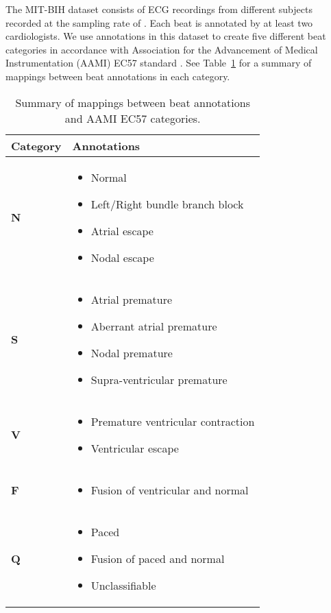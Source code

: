 \documentclass[10pt, conference, compsocconf]{IEEEtran}
\begin{document}
The MIT-BIH dataset consists of ECG recordings from  different subjects recorded at the sampling rate of . Each beat is annotated by at least two cardiologists. We use annotations in this dataset to create five different beat categories in accordance with Association for the Advancement of Medical Instrumentation (AAMI) EC57 standard \cite{association1998testing}. See Table~\ref{tab:aami} for a summary of mappings between beat annotations in each category.

\begin{table}[!t]
\renewcommand{\arraystretch}{1.3}
\caption{Summary of mappings between beat annotations and AAMI EC57 \cite{association1998testing} categories.}
\label{tab:aami}
\centering
\begin{tabular}{lp{2.0in}}
\hline
\textbf{Category} & \textbf{Annotations} \\
\hline
\hline
\textbf{N} & \begin{itemize} \item Normal \item Left/Right bundle branch block \item Atrial escape \item Nodal escape \end{itemize}\\
\hline
\textbf{S} & \begin{itemize} \item Atrial premature  \item Aberrant atrial premature \item Nodal premature \item Supra-ventricular premature \end{itemize}\\
\hline
\textbf{V} & \begin{itemize} \item Premature ventricular contraction \item Ventricular escape \end{itemize}\\
\hline
\textbf{F} & \begin{itemize} \item Fusion of ventricular and normal \end{itemize}\\
\hline
\textbf{Q} & \begin{itemize}
    \item Paced \item Fusion of paced and normal \item Unclassifiable \end{itemize}\\
\hline
\end{tabular}
\end{table}
\end{document}
